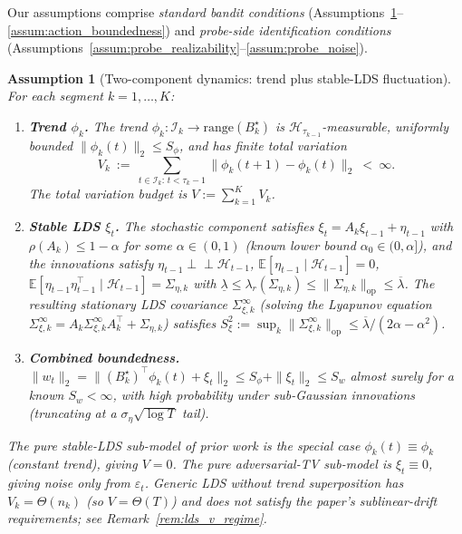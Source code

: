 \documentclass[11pt]{article}
\newcommand{\E}{\mathbb{E}}
\newcommand{\op}{\mathrm{op}}
\newcommand{\cH}{\mathcal{H}}
\newcommand{\cI}{\mathcal{I}}
\newcommand{\range}{\mathrm{range}}
\newtheorem{assumption}{Assumption}
\begin{document}
Our assumptions comprise \emph{standard bandit conditions}
(Assumptions~\ref{assum:latent_dynamics}--\ref{assum:action_boundedness}) and
\emph{probe-side identification conditions}
(Assumptions~\ref{assum:probe_realizability}--\ref{assum:probe_noise}).

\begin{assumption}[Two-component dynamics: trend plus stable-LDS fluctuation]
\label{assum:latent_dynamics}
For each segment $k=1,\ldots,K$:
\begin{enumerate}[label=\textup{(\alph*)},leftmargin=1.6em,nosep]
\item \textbf{Trend $\phi_k$.} The trend $\phi_k:\cI_k\to\range(B_k^\star)$ is
$\cH_{\tau_{k-1}}$-measurable, uniformly bounded $\|\phi_k(t)\|_2\le S_\phi$, and
has finite total variation
\[
  V_k\ :=\ \sum_{t\in\cI_k:\,t<\tau_k-1}\|\phi_k(t+1)-\phi_k(t)\|_2\ <\ \infty.
\]
The total variation budget is $V:=\sum_{k=1}^K V_k$.
\item \textbf{Stable LDS $\xi_t$.} The stochastic component satisfies
$\xi_t=A_k\xi_{t-1}+\eta_{t-1}$ with $\rho(A_k)\le 1-\alpha$ for some
$\alpha\in(0,1)$ (known lower bound $\alpha_0\in(0,\alpha]$), and the
innovations satisfy
$\eta_{t-1}\perp\!\!\!\perp\cH_{t-1}$, $\E[\eta_{t-1}\mid\cH_{t-1}]=0$,
$\E[\eta_{t-1}\eta_{t-1}^\top\mid\cH_{t-1}]=\Sigma_{\eta,k}$ with
$\underline\lambda\le\lambda_r(\Sigma_{\eta,k})\le\|\Sigma_{\eta,k}\|_{\op}\le\overline\lambda$.
The resulting stationary LDS covariance $\Sigma_{\xi,k}^\infty$ (solving the
Lyapunov equation $\Sigma_{\xi,k}^\infty=A_k\Sigma_{\xi,k}^\infty A_k^\top+\Sigma_{\eta,k}$)
satisfies $S_\xi^2:=\sup_k\|\Sigma_{\xi,k}^\infty\|_{\op}\le\overline\lambda/(2\alpha-\alpha^2)$.
\item \textbf{Combined boundedness.} $\|w_t\|_2=\|(B_k^\star)^\top\phi_k(t)+\xi_t\|_2\le
S_\phi+\|\xi_t\|_2\le S_w$ almost surely for a known $S_w<\infty$, with high
probability under sub-Gaussian innovations (truncating at a $\sigma_\eta\sqrt{\log T}$ tail).
\end{enumerate}
The pure stable-LDS sub-model of prior work is the special case $\phi_k(t)\equiv
\phi_k$ (constant trend), giving $V=0$.  The pure adversarial-TV sub-model is
$\xi_t\equiv 0$, giving noise only from $\varepsilon_t$.  Generic LDS without
trend superposition has $V_k=\Theta(n_k)$ (so $V=\Theta(T)$) and does not satisfy
the paper's sublinear-drift requirements; see Remark~\ref{rem:lds_v_regime}.
\end{assumption}
\end{document}
